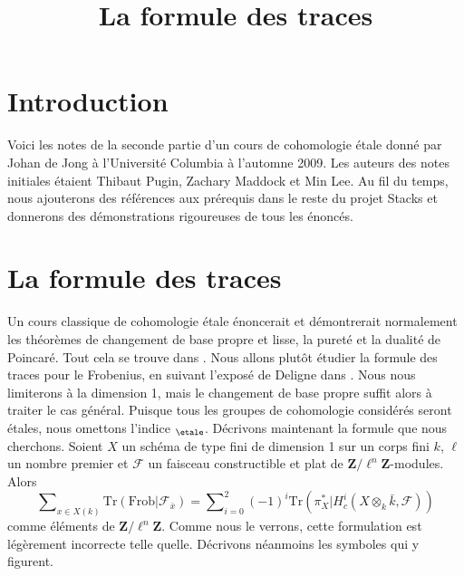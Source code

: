 

%


\title{La formule des traces}


\maketitle

\label{section-phantom}

\tableofcontents


\section{Introduction}
\label{section-introduction}

\noindent
Voici les notes de la seconde partie d'un cours de cohomologie \'etale
donné par Johan de Jong à l'Université Columbia à l'automne 2009. Les
auteurs des notes initiales étaient Thibaut Pugin, Zachary Maddock et Min Lee.
Au fil du temps, nous ajouterons des références aux prérequis dans le reste du
projet Stacks et donnerons des démonstrations rigoureuses de tous les énoncés.









\section{La formule des traces}
\label{section-trace-formula}

\noindent
Un cours classique de cohomologie \'etale énoncerait et démontrerait normalement
les théorèmes de changement de base propre et lisse, la pureté et la dualité de
Poincar\'e. Tout cela se trouve dans \cite[Arcata]{SGA4.5}. Nous allons plutôt
étudier la formule des traces pour le Frobenius, en suivant l'exposé de Deligne
dans \cite[Rapport]{SGA4.5}. Nous nous limiterons à la dimension 1, mais le
changement de base propre suffit alors à traiter le cas général. Puisque tous
les groupes de cohomologie considérés seront \'etales, nous omettons l'indice
$_\etale$. Décrivons maintenant
la formule que nous cherchons. Soient $X$ un schéma de type fini de dimension 1
sur un corps fini $k$, $\ell$ un nombre premier et $\mathcal{F}$ un faisceau
constructible et plat de $\mathbf{Z}/\ell^n\mathbf{Z}$-modules. Alors
\begin{equation}
\label{equation-trace-formula-initial}
\sum\nolimits_{x \in X(k)}
\text{Tr}(\text{Frob} | \mathcal{F}_{\bar x}) =
\sum\nolimits_{i = 0}^2
(-1)^i \text{Tr}(\pi_X^* | H^i_c(X \otimes_k \bar k, \mathcal{F}))
\end{equation}
comme éléments de $\mathbf{Z}/\ell^n\mathbf{Z}$. Comme nous le verrons, cette
formulation est légèrement incorrecte telle quelle. Décrivons néanmoins les
symboles qui y figurent.




